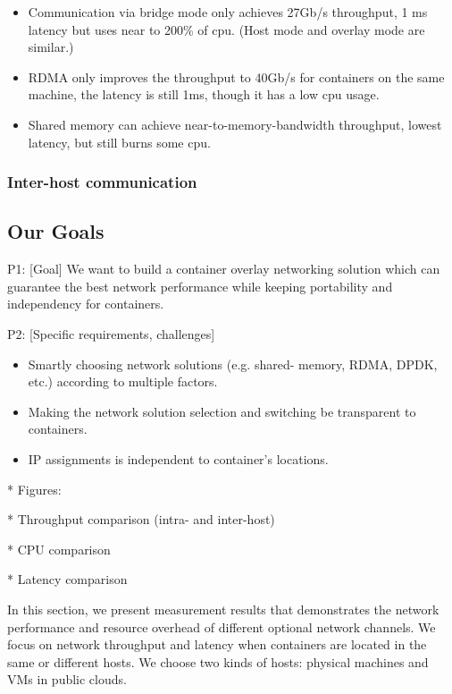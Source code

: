 \begin{itemize}
  \item Communication via bridge mode only achieves 27Gb/s throughput, 1 ms latency but uses near to 200\% of cpu. (Host mode and overlay mode are similar.)
  \item RDMA only improves the throughput to 40Gb/s for containers on the same machine, the latency is still 1ms, though it has a low cpu usage.
  \item Shared memory can achieve near-to-memory-bandwidth throughput, lowest latency, but still burns some cpu. 
\end{itemize}


\subsubsection{Inter-host communication}



\subsection{Our Goals}
P1: [Goal] We want to build a container overlay networking solution which can guarantee the best network performance while keeping portability and independency for containers.

P2: [Specific requirements, challenges]
\begin{itemize}
  \item Smartly choosing network solutions (e.g. shared- memory, RDMA, DPDK, etc.) according to multiple factors.
  \item Making the network solution selection and switching be transparent to containers.
  \item IP assignments is independent to container's locations.
\end{itemize}

\iffalse

* Figures:

* Throughput comparison (intra- and inter-host)

* CPU comparison

* Latency comparison

In this section, we present measurement results that demonstrates the network performance and resource overhead of different optional network channels. We focus on network throughput and latency when containers are located in the same or different hosts. 
We choose two kinds of hosts: physical machines and VMs in public clouds.

